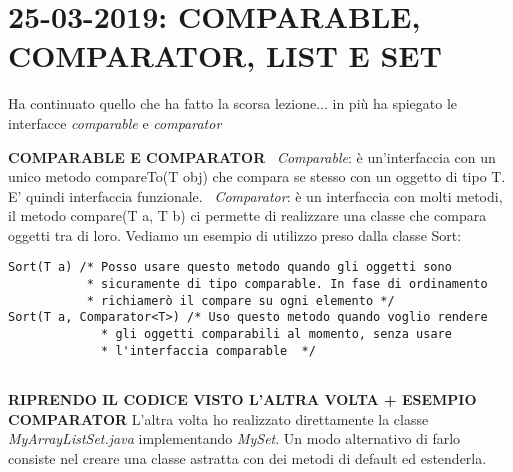 

\newpage
\section{25-03-2019: COMPARABLE, COMPARATOR, LIST E SET}
\noindent Ha continuato quello che ha fatto la scorsa lezione... in più ha spiegato le interfacce \textit{comparable} e \textit{comparator} \newline 

\noindent \textbf{COMPARABLE E COMPARATOR}\newline
\textbullet\ \textit{Comparable}: è un'interfaccia con un unico metodo compareTo(T obj) che compara se stesso con un oggetto di tipo T. E' quindi interfaccia funzionale. \newline
\textbullet\ \textit{Comparator}: è un interfaccia con molti metodi, il metodo compare(T a, T b) ci permette di realizzare una classe che compara oggetti tra di loro. \newline
Vediamo un esempio di utilizzo preso dalla classe Sort: \newline
\begin{lstlisting}
Sort(T a) /* Posso usare questo metodo quando gli oggetti sono 
		   * sicuramente di tipo comparable. In fase di ordinamento
		   * richiamerò il compare su ogni elemento */
Sort(T a, Comparator<T>) /* Uso questo metodo quando voglio rendere
		     * gli oggetti comparabili al momento, senza usare
		     * l'interfaccia comparable  */
		     
\end{lstlisting}

\noindent \textbf{RIPRENDO IL CODICE VISTO L'ALTRA VOLTA + ESEMPIO COMPARATOR}\newline
L'altra volta ho realizzato direttamente la classe \textit{MyArrayListSet.java} implementando \textit{MySet}.
Un modo alternativo di farlo consiste nel creare una classe astratta con dei metodi di default ed estenderla. 

